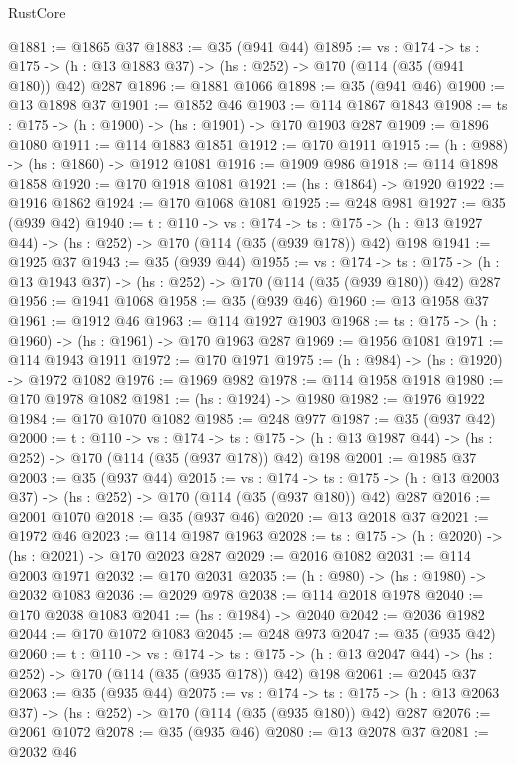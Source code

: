 \begin{lexlean}{RustCore}
\begin{coremodule}
@1881 := @1865 @37
@1883 := @35 (@941 @44)
@1895 := {vs : @174} ->
  {ts : @175} -> (h : @13 @1883 @37) -> (hs : @252) -> @170 (@114 (@35 (@941 @180)) @42) @287
@1896 := @1881 @1066
@1898 := @35 (@941 @46)
@1900 := @13 @1898 @37
@1901 := @1852 @46
@1903 := @114 @1867 @1843
@1908 := {ts : @175} -> (h : @1900) -> (hs : @1901) -> @170 @1903 @287
@1909 := @1896 @1080
@1911 := @114 @1883 @1851
@1912 := @170 @1911
@1915 := (h : @988) -> (hs : @1860) -> @1912 @1081
@1916 := @1909 @986
@1918 := @114 @1898 @1858
@1920 := @170 @1918 @1081
@1921 := (hs : @1864) -> @1920
@1922 := @1916 @1862
@1924 := @170 @1068 @1081
@1925 := @248 @981
@1927 := @35 (@939 @42)
@1940 := {t : @110} ->
  {vs : @174} ->
  {ts : @175} -> (h : @13 @1927 @44) -> (hs : @252) -> @170 (@114 (@35 (@939 @178)) @42) @198
@1941 := @1925 @37
@1943 := @35 (@939 @44)
@1955 := {vs : @174} ->
  {ts : @175} -> (h : @13 @1943 @37) -> (hs : @252) -> @170 (@114 (@35 (@939 @180)) @42) @287
@1956 := @1941 @1068
@1958 := @35 (@939 @46)
@1960 := @13 @1958 @37
@1961 := @1912 @46
@1963 := @114 @1927 @1903
@1968 := {ts : @175} -> (h : @1960) -> (hs : @1961) -> @170 @1963 @287
@1969 := @1956 @1081
@1971 := @114 @1943 @1911
@1972 := @170 @1971
@1975 := (h : @984) -> (hs : @1920) -> @1972 @1082
@1976 := @1969 @982
@1978 := @114 @1958 @1918
@1980 := @170 @1978 @1082
@1981 := (hs : @1924) -> @1980
@1982 := @1976 @1922
@1984 := @170 @1070 @1082
@1985 := @248 @977
@1987 := @35 (@937 @42)
@2000 := {t : @110} ->
  {vs : @174} ->
  {ts : @175} -> (h : @13 @1987 @44) -> (hs : @252) -> @170 (@114 (@35 (@937 @178)) @42) @198
@2001 := @1985 @37
@2003 := @35 (@937 @44)
@2015 := {vs : @174} ->
  {ts : @175} -> (h : @13 @2003 @37) -> (hs : @252) -> @170 (@114 (@35 (@937 @180)) @42) @287
@2016 := @2001 @1070
@2018 := @35 (@937 @46)
@2020 := @13 @2018 @37
@2021 := @1972 @46
@2023 := @114 @1987 @1963
@2028 := {ts : @175} -> (h : @2020) -> (hs : @2021) -> @170 @2023 @287
@2029 := @2016 @1082
@2031 := @114 @2003 @1971
@2032 := @170 @2031
@2035 := (h : @980) -> (hs : @1980) -> @2032 @1083
@2036 := @2029 @978
@2038 := @114 @2018 @1978
@2040 := @170 @2038 @1083
@2041 := (hs : @1984) -> @2040
@2042 := @2036 @1982
@2044 := @170 @1072 @1083
@2045 := @248 @973
@2047 := @35 (@935 @42)
@2060 := {t : @110} ->
  {vs : @174} ->
  {ts : @175} -> (h : @13 @2047 @44) -> (hs : @252) -> @170 (@114 (@35 (@935 @178)) @42) @198
@2061 := @2045 @37
@2063 := @35 (@935 @44)
@2075 := {vs : @174} ->
  {ts : @175} -> (h : @13 @2063 @37) -> (hs : @252) -> @170 (@114 (@35 (@935 @180)) @42) @287
@2076 := @2061 @1072
@2078 := @35 (@935 @46)
@2080 := @13 @2078 @37
@2081 := @2032 @46

\end{coremodule}
\end{lexlean}
